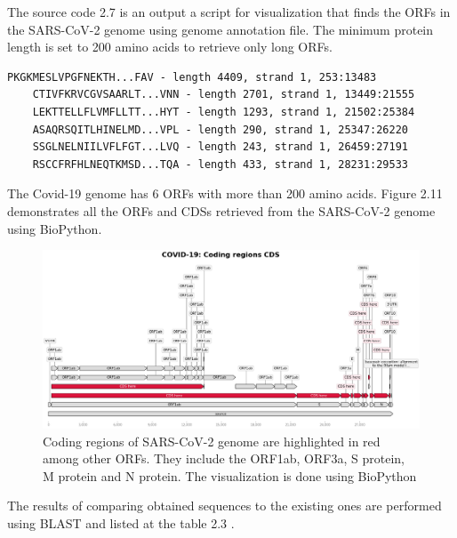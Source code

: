 The source code 2.7 is an output a script for visualization that finds the ORFs in the SARS-CoV-2 genome using genome annotation file. 
The minimum protein length is set to 200 amino acids to retrieve only long ORFs.

\begin{lstlisting}[caption=Positions of SARS-CoV-2 genome CDSs]
    PKGKMESLVPGFNEKTH...FAV - length 4409, strand 1, 253:13483
    CTIVFKRVCGVSAARLT...VNN - length 2701, strand 1, 13449:21555
    LEKTTELLFLVMFLLTT...HYT - length 1293, strand 1, 21502:25384
    ASAQRSQITLHINELMD...VPL - length 290, strand 1, 25347:26220
    SSGLNELNIILVFLFGT...LVQ - length 243, strand 1, 26459:27191
    RSCCFRFHLNEQTKMSD...TQA - length 433, strand 1, 28231:29533
\end{lstlisting}

The Covid-19 genome has 6 ORFs with more than 200 amino acids. Figure 2.11 demonstrates all the ORFs and CDSs retrieved from the SARS-CoV-2 genome using BioPython.

\begin{figure}[!ht]
	\centering
	\includegraphics[width=1\textwidth]{figures/cds.png}
	\caption{Coding regions of SARS-CoV-2 genome are highlighted in red among other ORFs. They include the ORF1ab, ORF3a, S protein, M protein and N protein. The visualization is done using BioPython\label{o:latex_friendly_zone}}
\end{figure}

The results of comparing obtained sequences to the existing ones are performed using BLAST and listed at the table 2.3 .

